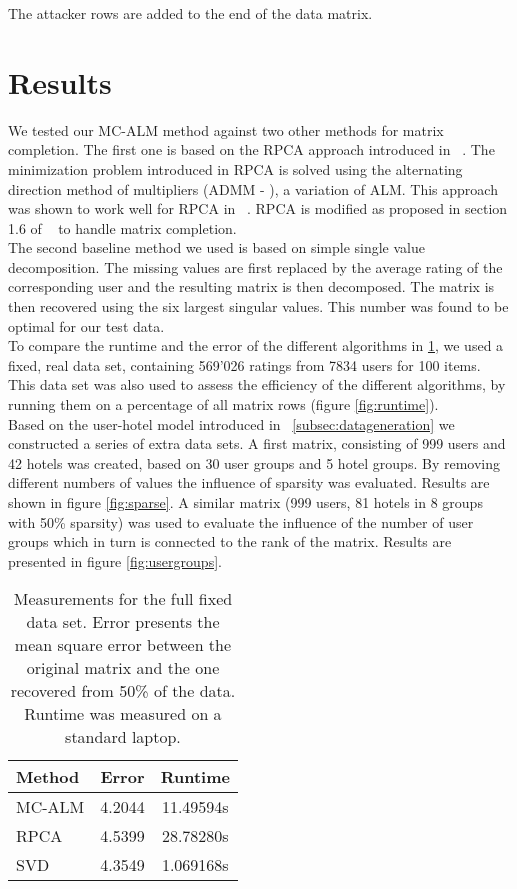 \documentclass[10pt,conference,compsocconf]{IEEEtran}
\begin{document}
The attacker rows are added to the end of the data matrix.


\section{Results}
We tested our MC-ALM method against two other methods for matrix completion. The first one is based on the RPCA approach introduced in ~\cite{rpcapaper}. The minimization problem introduced in RPCA is solved using the alternating direction method of multipliers (ADMM - \cite{rpcaalgo}), a variation of ALM. This approach was shown to work well for RPCA in ~\cite{almpaper}. RPCA is modified as proposed in section 1.6 of ~\cite{rpcapaper} to handle matrix completion.\\
The second baseline method we used is based on simple single value decomposition. The missing values are first replaced by the average rating of the corresponding user and the resulting matrix is then decomposed. The matrix is then recovered using the six largest singular values. This number was found to be optimal for our test data.\\

To compare the runtime and the error of the different algorithms in \ref{tab:overview}, we used a fixed, real data set, containing 569'026 ratings from 7834 users for 100 items. This data set was also used to assess the efficiency of the different algorithms, by running them on a percentage of all matrix rows (figure \ref{fig:runtime}).\\

Based on the user-hotel model introduced in ~\ref{subsec:datageneration} we constructed a series of extra data sets. A first matrix, consisting of 999 users and 42 hotels was created, based on 30 user groups and 5 hotel groups. By removing different numbers of values the influence of sparsity was evaluated. Results are shown in figure \ref{fig:sparse}. A similar matrix (999 users, 81 hotels in 8 groups with 50\% sparsity) was used to evaluate the influence of the number of user groups which in turn is connected to the rank of the matrix. Results are presented in figure \ref{fig:usergroups}.


\begin{table}%
\centering
\begin{tabular}{|l|c|c|}
\hline
Method & Error & Runtime\\
\hline
MC-ALM & 4.2044 & 11.49594s\\
RPCA & 4.5399 & 28.78280s\\
SVD & 4.3549 & 1.069168s\\
\hline
\end{tabular}
\caption{Measurements for the full fixed data set. Error presents the mean square error between the original matrix and the one recovered from 50\% of the data. Runtime was measured on a standard laptop.}
\label{tab:overview}
\end{table}
\end{document}
